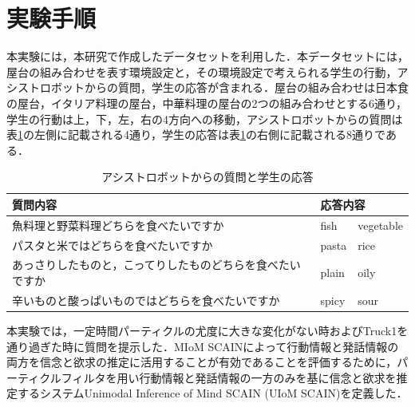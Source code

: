 \section{実験手順}

\par
本実験には，本研究で作成したデータセットを利用した．本データセットには，屋台の組み合わせを表す環境設定と，その環境設定で考えられる学生の行動，アシストロボットからの質問，学生の応答が含まれる．屋台の組み合わせは日本食の屋台，イタリア料理の屋台，中華料理の屋台の2つの組み合わせとする6通り，学生の行動は上，下，左，右の4方向への移動，アシストロボットからの質問は表\ref{tab:q_a}の左側に記載される4通り，学生の応答は表\ref{tab:q_a}の右側に記載される8通りである．
\begin{table}[htb]
  \begin{center}
  \caption{アシストロボットからの質問と学生の応答}
  \label{tab:q_a}
  \begin{tabular}{lll} \hline
    質問内容&\multicolumn{2}{l}{応答内容}\\\hline
    魚料理と野菜料理どちらを食べたいですか&fish&vegetable\\
    パスタと米ではどちらを食べたいですか&pasta&rice\\
    あっさりしたものと，こってりしたものどちらを食べたいですか&plain&oily\\
    辛いものと酸っぱいものではどちらを食べたいですか&spicy&sour\\\hline
  \end{tabular}
\end{center}
\end{table}
本実験では，一定時間パーティクルの尤度に大きな変化がない時およびTruck1を通り過ぎた時に質問を提示した．MIoM SCAINによって行動情報と発話情報の両方を信念と欲求の推定に活用することが有効であることを評価するために，パーティクルフィルタを用い行動情報と発話情報の一方のみを基に信念と欲求を推定するシステムUnimodal Inference of Mind SCAIN (UIoM SCAIN)を定義した．


